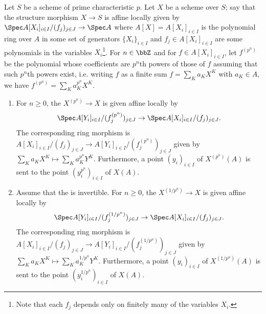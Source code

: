 \begin{proposition} \label{proposition:arithmetic_and_geometric_frobenius_details}
    Let $S$ be a scheme of prime characteristic $p$. Let $X$ be a scheme over $S$; say that the structure morphism $X \to S$ is affine locally given by $\Spec A[X_i]_{i \in I}/(f_j)_{j \in J} \to \Spec A$ where $A[X] = A[X_i]_{i \in I}$ is the polynomial ring over $A$ in some set of generators $\{X_i\}_{i \in I}$ and $f_j \in A[X_i]_{i \in I}$ are some polynomials in the variables $X_i$\footnote{Note that each $f_j$ depends only on finitely many of the variables $X_i$.}. For $n \in \bbZ$ and for $f \in A[X_i]_{i \in I}$, let $f^{(p^n)}$ be the polynomial whose coefficients are $p^n$th powers of those of $f$ assuming that such $p^n$th powers exist, i.e. writing $f$ as a finite sum $f = \sum_K a_K X^K$ with $a_K \in A$, we have $f^{(p^n)} = \sum_K a_K^{p^n} X^K$.

    \begin{enumerate}
        \item For $n \geq 0$, the  $X^{(p^n)} \to X$ is given affine locally by \label{part:arithmetic_frobenius_details}  
        $$\Spec A[Y_i]_{i \in I} / (f^{(p^n)}_j)_{j \in J} \to \Spec A[X_i]_{i \in I} / (f_j)_{j \in J}.$$
        The corresponding ring morphism is $A[X_i]_{i \in I} / (f_j)_{j \in J} \to A[Y_i]_{i \in I} / (f^{(p^n)}_j)_{j \in J}$ given by $\sum_K a_K X^K \mapsto \sum_K a_K^{p^n} Y^K$. 
        Furthermore, a point $(y_i)_{i \in I}$ of $X^{(p^n)}(A)$ is sent to the point $(y_i^{p^n})_{i \in I}$ of $X(A)$.  

        \item Assume that the  is invertible. For $n \geq 0$, the  $X^{(1/p^n)} \to X$ \label{part:geometric_frobenius_details}
        is given affine locally by 
        $$\Spec A[Y_i]_{i \in I} / (f^{(1/p^n)}_j)_{j \in J} \to \Spec A[X_i]_{i \in I} / (f_j)_{j \in J}.$$
        The corresponding ring morphism is $A[X_i]_{i \in I} / (f_j)_{j \in J} \to A[Y_i]_{i \in I} / (f^{(1/p^n)}_j)_{j \in J}$ given by $\sum_K a_K X^K \mapsto \sum_K a_K^{1/p^n} Y^K$. 
        Furthermore, a point $(y_i)_{i \in I}$ of $X^{(1/p^n)}(A)$ is sent to the point $(y_i^{1/p^n})_{i \in I}$ of $X(A)$.  


    \end{enumerate}
\end{proposition}

